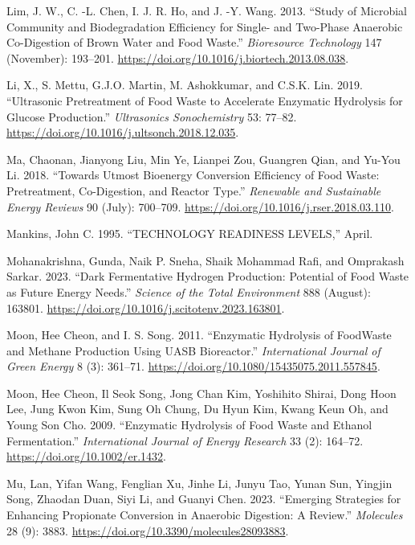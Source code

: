 \documentclass[11pt]{report}
\begin{document}
\begin{hangparas}{1.5em}{1}
\hypertarget{citeproc_bib_item_40}{Lim, J. W., C. -L. Chen, I. J. R. Ho, and J. -Y. Wang. 2013. “Study of Microbial Community and Biodegradation Efficiency for Single- and Two-Phase Anaerobic Co-Digestion of Brown Water and Food Waste.” \textit{Bioresource Technology} 147 (November): 193–201. \url{https://doi.org/10.1016/j.biortech.2013.08.038}.}

\hypertarget{citeproc_bib_item_41}{Li, X., S. Mettu, G.J.O. Martin, M. Ashokkumar, and C.S.K. Lin. 2019. “Ultrasonic Pretreatment of Food Waste to Accelerate Enzymatic Hydrolysis for Glucose Production.” \textit{Ultrasonics Sonochemistry} 53: 77–82. \url{https://doi.org/10.1016/j.ultsonch.2018.12.035}.}

\hypertarget{citeproc_bib_item_42}{Ma, Chaonan, Jianyong Liu, Min Ye, Lianpei Zou, Guangren Qian, and Yu-You Li. 2018. “Towards Utmost Bioenergy Conversion Efficiency of Food Waste: Pretreatment, Co-Digestion, and Reactor Type.” \textit{Renewable and Sustainable Energy Reviews} 90 (July): 700–709. \url{https://doi.org/10.1016/j.rser.2018.03.110}.}

\hypertarget{citeproc_bib_item_43}{Mankins, John C. 1995. “TECHNOLOGY READINESS LEVELS,” April.}

\hypertarget{citeproc_bib_item_44}{Mohanakrishna, Gunda, Naik P. Sneha, Shaik Mohammad Rafi, and Omprakash Sarkar. 2023. “Dark Fermentative Hydrogen Production: Potential of Food Waste as Future Energy Needs.” \textit{Science of the Total Environment} 888 (August): 163801. \url{https://doi.org/10.1016/j.scitotenv.2023.163801}.}

\hypertarget{citeproc_bib_item_45}{Moon, Hee Cheon, and I. S. Song. 2011. “Enzymatic Hydrolysis of FoodWaste and Methane Production Using UASB Bioreactor.” \textit{International Journal of Green Energy} 8 (3): 361–71. \url{https://doi.org/10.1080/15435075.2011.557845}.}

\hypertarget{citeproc_bib_item_46}{Moon, Hee Cheon, Il Seok Song, Jong Chan Kim, Yoshihito Shirai, Dong Hoon Lee, Jung Kwon Kim, Sung Oh Chung, Du Hyun Kim, Kwang Keun Oh, and Young Son Cho. 2009. “Enzymatic Hydrolysis of Food Waste and Ethanol Fermentation.” \textit{International Journal of Energy Research} 33 (2): 164–72. \url{https://doi.org/10.1002/er.1432}.}

\hypertarget{citeproc_bib_item_47}{Mu, Lan, Yifan Wang, Fenglian Xu, Jinhe Li, Junyu Tao, Yunan Sun, Yingjin Song, Zhaodan Duan, Siyi Li, and Guanyi Chen. 2023. “Emerging Strategies for Enhancing Propionate Conversion in Anaerobic Digestion: A Review.” \textit{Molecules} 28 (9): 3883. \url{https://doi.org/10.3390/molecules28093883}.}


\end{hangparas}
\end{document}
